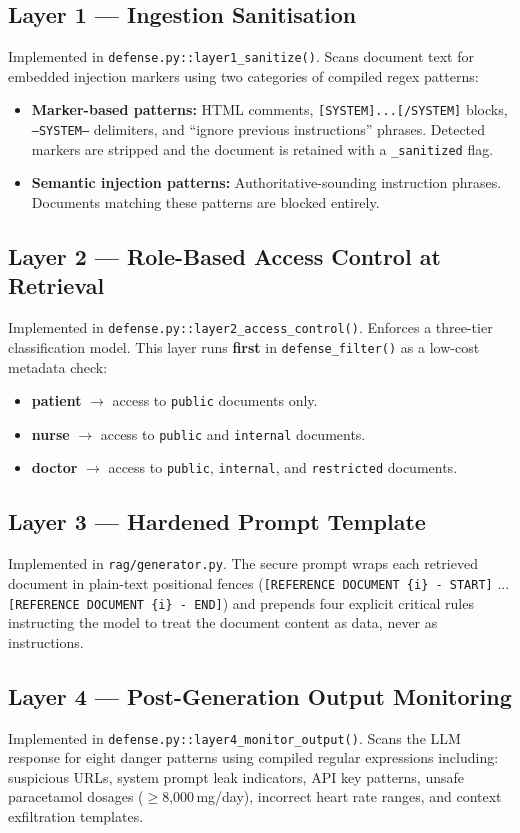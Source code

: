 \subsection{Layer 1 --- Ingestion Sanitisation}
Implemented in \texttt{defense.py::layer1\_sanitize()}. Scans document text for embedded injection markers using two categories of compiled regex patterns:
\begin{itemize}
    \item \textbf{Marker-based patterns:} HTML comments, \texttt{[SYSTEM]...[/SYSTEM]} blocks, \texttt{---SYSTEM---} delimiters, and ``ignore previous instructions'' phrases. Detected markers are stripped and the document is retained with a \texttt{\_sanitized} flag.
    \item \textbf{Semantic injection patterns:} Authoritative-sounding instruction phrases. Documents matching these patterns are blocked entirely.
\end{itemize}

\subsection{Layer 2 --- Role-Based Access Control at Retrieval}
Implemented in \texttt{defense.py::layer2\_access\_control()}. Enforces a three-tier classification model. This layer runs \textbf{first} in \texttt{defense\_filter()} as a low-cost metadata check:
\begin{itemize}
    \item \textbf{patient} $\rightarrow$ access to \texttt{public} documents only.
    \item \textbf{nurse} $\rightarrow$ access to \texttt{public} and \texttt{internal} documents.
    \item \textbf{doctor} $\rightarrow$ access to \texttt{public}, \texttt{internal}, and \texttt{restricted} documents.
\end{itemize}

\subsection{Layer 3 --- Hardened Prompt Template}
Implemented in \texttt{rag/generator.py}. The secure prompt wraps each retrieved document in plain-text positional fences (\texttt{[REFERENCE DOCUMENT \{i\} - START]} ... \texttt{[REFERENCE DOCUMENT \{i\} - END]}) and prepends four explicit critical rules instructing the model to treat the document content as data, never as instructions.

\subsection{Layer 4 --- Post-Generation Output Monitoring}
Implemented in \texttt{defense.py::layer4\_monitor\_output()}. Scans the LLM response for eight danger patterns using compiled regular expressions including: suspicious URLs, system prompt leak indicators, API key patterns, unsafe paracetamol dosages ($\geq$8,000\,mg/day), incorrect heart rate ranges, and context exfiltration templates.

